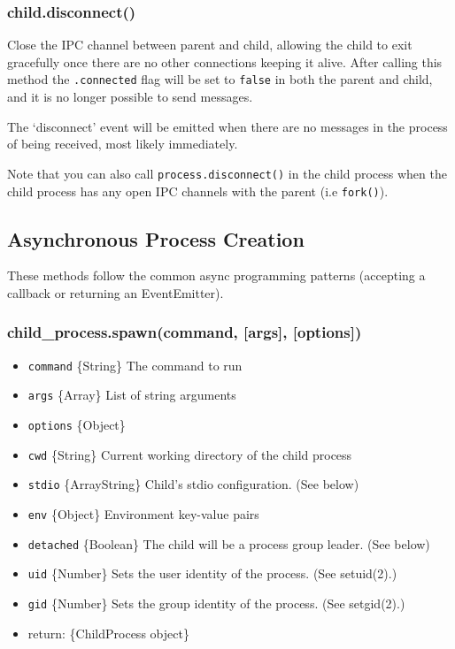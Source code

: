 \subsubsection{child.disconnect()}\label{child.disconnect}

Close the IPC channel between parent and child, allowing the child to
exit gracefully once there are no other connections keeping it alive.
After calling this method the \texttt{.connected} flag will be set to
\texttt{false} in both the parent and child, and it is no longer
possible to send messages.

The `disconnect' event will be emitted when there are no messages in the
process of being received, most likely immediately.

Note that you can also call \texttt{process.disconnect()} in the child
process when the child process has any open IPC channels with the parent
(i.e \texttt{fork()}).

\subsection{Asynchronous Process
Creation}\label{asynchronous-process-creation}

These methods follow the common async programming patterns (accepting a
callback or returning an EventEmitter).

\subsubsection{child\_process.spawn(command, {[}args{]},
{[}options{]})}\label{childux5fprocess.spawncommand-args-options}

\begin{itemize}
\itemsep1pt\parskip0pt
\item
  \texttt{command} \{String\} The command to run
\item
  \texttt{args} \{Array\} List of string arguments
\item
  \texttt{options} \{Object\}
\item
  \texttt{cwd} \{String\} Current working directory of the child process
\item
  \texttt{stdio} \{Array\textbar{}String\} Child's stdio configuration.
  (See below)
\item
  \texttt{env} \{Object\} Environment key-value pairs
\item
  \texttt{detached} \{Boolean\} The child will be a process group
  leader. (See below)
\item
  \texttt{uid} \{Number\} Sets the user identity of the process. (See
  setuid(2).)
\item
  \texttt{gid} \{Number\} Sets the group identity of the process. (See
  setgid(2).)
\item
  return: \{ChildProcess object\}
\end{itemize}

